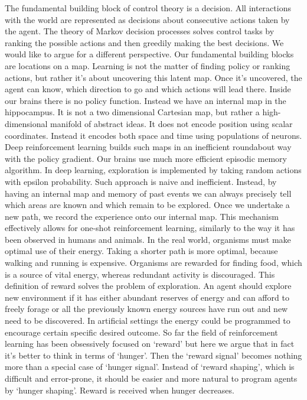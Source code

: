 \documentclass[12pt]{article}
\begin{document}
The fundamental building block of control theory is a decision. All interactions with the world are represented as decisions about consecutive  actions taken by the agent. The theory of Markov decision processes solves control tasks by ranking the possible actions and then greedily making the best decisions. We would like to argue for a different perspective. Our fundamental building blocks are locations on a map. Learning is not the matter of finding policy or ranking actions, but rather it's about uncovering this latent map. Once it's uncovered, the agent can know, which direction to go and which actions will lead there. Inside our brains there is no policy function. Instead we have an internal map in the hippocampus. It is not a two dimensional Cartesian map, but rather a high-dimensional manifold of abstract ideas. It does not encode position using scalar coordinates. Instead it encodes both space and time using populations of neurons. Deep reinforcement learning builds such maps in an inefficient roundabout way with the policy gradient. Our brains use much more efficient episodic memory algorithm. In deep learning, exploration is implemented by taking random actions with epsilon probability. Such approach is naive and inefficient. Instead, by having an internal map and memory of past events we can  always precisely tell which areas are known and which remain to be explored. Once we undertake a new path, we record the experience onto our internal map. This mechanism effectively allows  for one-shot reinforcement learning, similarly to the way it has been observed in humans and animals. In the real world, organisms must make optimal use of their energy. Taking a shorter path is more optimal, because walking and running is expensive. Organisms are rewarded for finding food, which is a source of vital energy, whereas redundant activity is discouraged. This definition of reward solves the problem of exploration. An agent should explore new environment if it has either abundant reserves of energy and can afford to freely forage or all the previously known energy sources have run out and new need to be discovered.
In artificial settings the energy could be programmed to encourage certain specific desired outcome. So far the field of reinforcement learning has been obsessively focused on `reward' but here we argue that in fact it's better to think in terms of `hunger'. Then the `reward signal' becomes nothing more than a special case of `hunger signal'. Instead of  `reward shaping', which is difficult and error-prone, it should be easier and more natural to program agents by `hunger shaping'. Reward is received when hunger decreases.
\end{document}
